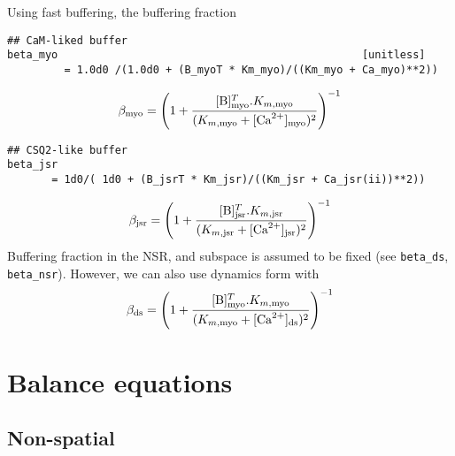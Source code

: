 Using fast buffering, the buffering fraction
\begin{verbatim}
## CaM-liked buffer
beta_myo                                                [unitless]
         = 1.0d0 /(1.0d0 + (B_myoT * Km_myo)/((Km_myo + Ca_myo)**2))
\end{verbatim}
\begin{equation}
  \label{eq:20}
  \beta_{\text{myo}} = \left( 1+ \frac{[{\text{B}}]_{\text{myo}}^T.K_{m,{\text{myo}}}}{(K_{m,{\text{myo}}}+[{\text{Ca}^{2+}}]_{\text{myo}})^2}\right)^{-1}
\end{equation}
\begin{verbatim}
## CSQ2-like buffer
beta_jsr 
       = 1d0/( 1d0 + (B_jsrT * Km_jsr)/((Km_jsr + Ca_jsr(ii))**2))               
\end{verbatim}
\begin{equation}
  \label{eq:21}
  \beta_{\text{jsr}} = \left(1+ \frac{[{\text{B}}]_{\text{jsr}}^T.K_{m,\text{jsr}}}{(K_{m,\text{jsr}}+[{\text{Ca}^{2+}}]_{\text{jsr}})^2}\right)^{-1}
\end{equation}
Buffering fraction in the NSR, and subspace is assumed to be fixed (see
\verb!beta_ds!, \verb!beta_nsr!). However, we can also use dynamics form with
\begin{equation}
\beta_{\text{ds}} = \left( 1+
\frac{[{\text{B}}]_{\text{myo}}^T.K_{m,{\text{myo}}}}{(K_{m,{\text{myo}}}+[{\text{Ca}^{2+}}]_{\text{ds}})^2}\right)^{-1}
\end{equation}


\section{Balance equations}
\label{sec:balance-equations}

\subsection{Non-spatial}
\label{sec:balance-eq_non-spatial}

